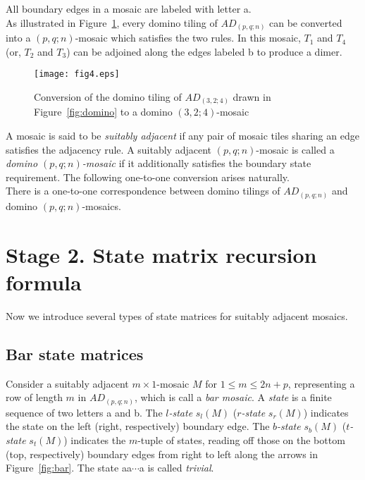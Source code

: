 \documentclass[11pt,a4paper]{amsart}
\begin{document}
All boundary edges in a mosaic are labeled with letter a.  \\

As illustrated in Figure~\ref{fig:conversion},
every domino tiling of $AD_{(p,q;n)}$ can be converted into 
a $(p,q;n)$-mosaic which satisfies the two rules.
In this mosaic, $T_1$ and $T_4$ (or, $T_2$ and $T_3$) can be adjoined along the edges
labeled b to produce a dimer.

\begin{figure}[h]
\texttt{[image: fig4.eps]}
\caption{Conversion  of the domino tiling of $AD_{(3,2;4)}$ drawn in Figure~\ref{fig:domino} 
to a domino $(3,2;4)$-mosaic}
\label{fig:conversion}
\end{figure}

A mosaic is said to be {\em suitably adjacent\/} if any pair of mosaic tiles
sharing an edge satisfies the adjacency rule.
A suitably adjacent $(p,q;n)$-mosaic is called a {\em domino $(p,q;n)$-mosaic\/}
if it additionally satisfies the boundary state requirement.
The following one-to-one conversion arises naturally. \\

There is a one-to-one correspondence between  
domino tilings of $AD_{(p,q;n)}$ and domino $(p,q;n)$-mosaics.



\section{Stage 2. State matrix recursion formula} \label{sec:stage2}

Now we introduce several types of state matrices for suitably adjacent mosaics.

\subsection{Bar state matrices} 

Consider a suitably adjacent $m \! \times \! 1$-mosaic $M$ for $1 \leq m \leq 2n \! + \! p$,
representing a row of length $m$ in $AD_{(p,q;n)}$, which is call a {\em bar mosaic\/}.
A {\em state\/} is a finite sequence of two letters a and b.
The {\em $l$-state\/} $s_l(M)$ ({\em $r$-state\/} $s_r(M)$) indicates 
the state on the left (right, respectively) boundary edge.
The {\em $b$-state\/} $s_b(M)$ ({\em $t$-state\/} $s_t(M)$) indicates 
the $m$-tuple of states, reading off those on the bottom (top, respectively) 
boundary edges from right to left along the arrows in Figure~\ref{fig:bar}.
The state aa$\cdots$a is called {\em trivial\/}.
\end{document}

